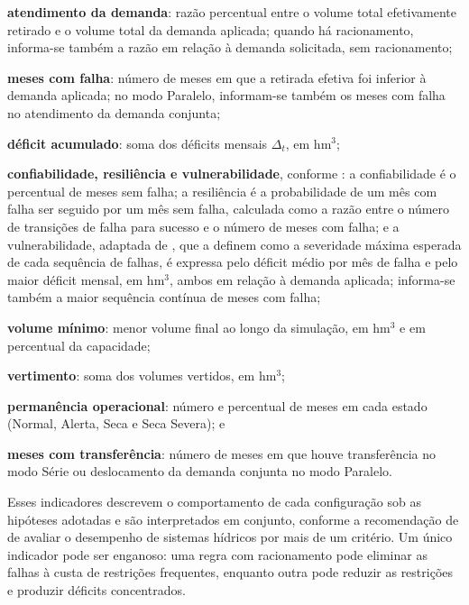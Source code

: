 \begin{alineas}
    \item \textbf{atendimento da demanda}: razão percentual entre o volume total efetivamente retirado e o volume total da demanda aplicada; quando há racionamento, informa-se também a razão em relação à demanda solicitada, sem racionamento;
    \item \textbf{meses com falha}: número de meses em que a retirada efetiva foi inferior à demanda aplicada; no modo Paralelo, informam-se também os meses com falha no atendimento da demanda conjunta;
    \item \textbf{déficit acumulado}: soma dos déficits mensais $\Delta_t$, em hm$^3$;
    \item \textbf{confiabilidade, resiliência e vulnerabilidade}, conforme : a confiabilidade é o percentual de meses sem falha; a resiliência é a probabilidade de um mês com falha ser seguido por um mês sem falha, calculada como a razão entre o número de transições de falha para sucesso e o número de meses com falha; e a vulnerabilidade, adaptada de , que a definem como a severidade máxima esperada de cada sequência de falhas, é expressa pelo déficit médio por mês de falha e pelo maior déficit mensal, em hm$^3$, ambos em relação à demanda aplicada; informa-se também a maior sequência contínua de meses com falha;
    \item \textbf{volume mínimo}: menor volume final ao longo da simulação, em hm$^3$ e em percentual da capacidade;
    \item \textbf{vertimento}: soma dos volumes vertidos, em hm$^3$;
    \item \textbf{permanência operacional}: número e percentual de meses em cada estado (Normal, Alerta, Seca e Seca Severa); e
    \item \textbf{meses com transferência}: número de meses em que houve transferência no modo Série ou deslocamento da demanda conjunta no modo Paralelo.
\end{alineas}

Esses indicadores descrevem o comportamento de cada configuração sob as hipóteses adotadas e são interpretados em conjunto, conforme a recomendação de  de avaliar o desempenho de sistemas hídricos por mais de um critério. Um único indicador pode ser enganoso: uma regra com racionamento pode eliminar as falhas à custa de restrições frequentes, enquanto outra pode reduzir as restrições e produzir déficits concentrados.
